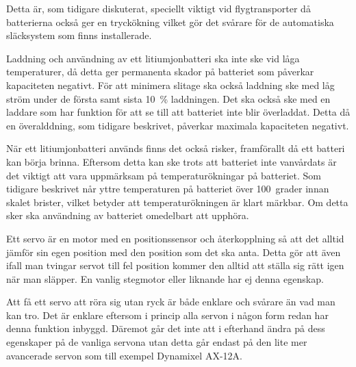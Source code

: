 \documentclass[a4paper,12pt]{article}
\begin{document}
Detta är, som tidigare diskuterat, speciellt viktigt vid flygtransporter då batterierna också ger en tryckökning vilket gör det svårare för de automatiska släcksystem som finns installerade.

Laddning och användning av ett litiumjonbatteri ska inte ske vid låga temperaturer, då detta ger permanenta skador på batteriet som påverkar kapaciteten negativt. För att minimera slitage ska också laddning ske med låg ström under de första samt sista 10~\% laddningen. Det ska också ske med en laddare som har funktion för att se till att batteriet inte blir överladdat. Detta då en överalddning, som tidigare beskrivet, påverkar maximala kapaciteten negativt.

När ett litiumjonbatteri används finns det också risker, framförallt då ett batteri kan börja brinna. Eftersom detta kan ske trots att batteriet inte vanvårdats är det viktigt att vara uppmärksam på temperaturökningar på batteriet. Som tidigare beskrivet når yttre temperaturen på batteriet över 100~grader innan skalet brister, vilket betyder att temperaturökningen är klart märkbar. Om detta sker ska användning av batteriet omedelbart att upphöra.

Ett servo är en motor med en positionssensor och återkopplning så att det alltid jämför sin egen position med den position som det ska anta. Detta gör att även ifall man tvingar servot till fel position kommer den alltid att ställa sig rätt igen när man släpper. En vanlig stegmotor eller liknande har ej denna egenskap.

Att få ett servo att röra sig utan ryck är både enklare och svårare än vad man kan tro. Det är enklare eftersom i princip alla servon i någon form redan har denna funktion inbyggd. Däremot går det inte att i efterhand ändra på dess egenskaper på de vanliga servona utan detta går endast på den lite mer avancerade servon som till exempel Dynamixel AX-12A. 

\newpage
\end{document}
